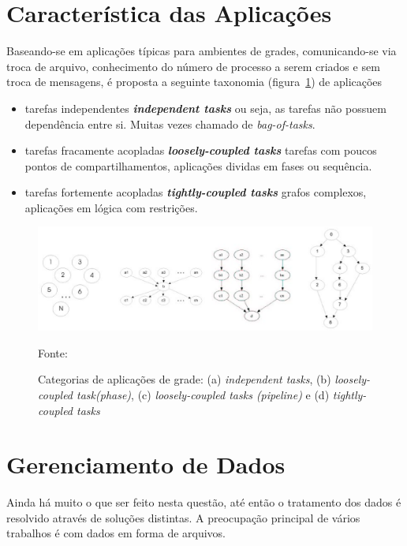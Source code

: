 \section{Característica das Aplicações}

Baseando-se em aplicações típicas para ambientes de grades, comunicando-se via troca de arquivo, conhecimento do número de processo a serem criados e sem troca de mensagens, é proposta a seguinte taxonomia (figura~\ref{fig:Taxonomia_Aplicacoes}) de aplicações \cite{Vargas2003, Vargas2005, Mangan2006}

\begin{itemize}
	\item tarefas independentes \emph{\textbf{independent tasks}} ou seja, as tarefas não possuem dependência entre si. Muitas vezes chamado de \emph{bag-of-tasks}.
	\item tarefas fracamente acopladas \emph{\textbf{loosely-coupled tasks}} tarefas com poucos pontos de compartilhamentos, aplicações dividas em fases ou sequência.
	\item tarefas fortemente acopladas \emph{\textbf{tightly-coupled tasks}} grafos complexos, aplicações em lógica com restrições.
\end{itemize}

\begin{figure}[htb]
\begin{center}
\includegraphics[scale=0.5]{./img/TaxonomiaAplicacoes.eps}
\caption{Categorias de aplicações de grade: (a) \emph{independent tasks}, (b) \emph{loosely-coupled task(phase)}, (c) \emph{loosely-coupled tasks (pipeline)} e (d) \emph{tightly-coupled tasks}}
\label{fig:Taxonomia_Aplicacoes}
Fonte: \cite{Mangan2006}
\end{center}
\end{figure}

\section{Gerenciamento de Dados}

Ainda há muito o que ser feito nesta questão, até então o tratamento dos dados é resolvido através de soluções distintas. A preocupação principal de vários trabalhos \cite
{GridFTP,LegionFS} é com dados em forma de arquivos.

